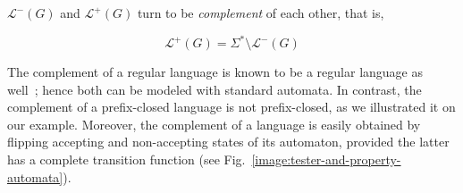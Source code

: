 $\mathcal{L}^{-}(G)$ and $\mathcal{L}^{+}(G)$ turn to be \emph{complement} of each other, that is, 

\begin{equation}
\mathcal{L}^{+}(G) = \Sigma^{*} \setminus \mathcal{L}^{-}(G)
\end{equation}

The complement of a regular language is known to be a regular language as well~\cite{Hopcroft:1979}; hence both can be modeled with standard automata. In contrast, the complement of a prefix-closed language is not prefix-closed, as we illustrated it on our example. Moreover, the complement of a language is easily obtained by flipping accepting and non-accepting states of its automaton, provided the latter has a complete transition function (see Fig.~\ref{image:tester-and-property-automata}). 

